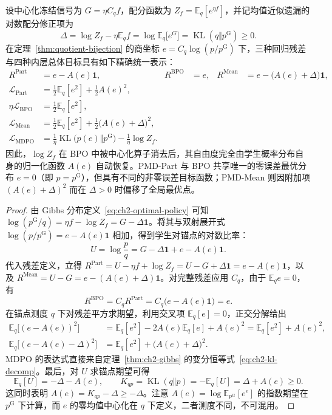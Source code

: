 \documentclass[lang=cn,scheme=chinese,openany]{elegantbook}
\newcommand{\E}{\mathbb E}
\newcommand{\KL}{\operatorname{KL}}
\begin{document}
\begin{theorem}[四种内层目标在同一商坐标中的精确表达]
\label{thm:quotient-losses}
设中心化冻结信号为 $G=\eta C_q f$，配分函数为 $Z_f=\E_q[e^{\eta f}]$，并记均值近似遗漏的对数配分修正项为
\begin{equation}
\Delta=\log Z_f-\eta\E_q f
=\log\E_q\bigl[e^G\bigr]=\KL(q\Vert p^{\mathrm G})\ge 0.
\end{equation}
在定理~\ref{thm:quotient-bijection} 的商坐标 $e=C_q\log(p/p^{\mathrm G})$ 下，三种回归残差与四种内层总体目标具有如下精确统一表示：
\begin{align}
R^{\mathrm{Part}}&=e-A(e)\mathbf1,&
R^{\mathrm{BPO}}&=e,&
R^{\mathrm{Mean}}&=e-\bigl(A(e)+\Delta\bigr)\mathbf1,\\
\mathcal L_{\mathrm{Part}}&=\tfrac12\E_q[e^2]+\tfrac12 A(e)^2,\\
\eta\mathcal L_{\mathrm{BPO}}&=\tfrac12\E_q[e^2],\\
\mathcal L_{\mathrm{Mean}}&=\tfrac12\E_q[e^2]+\tfrac12\bigl(A(e)+\Delta\bigr)^2,\\
\mathcal L_{\mathrm{MDPO}}&=\frac1\eta\KL\bigl(p(e)\Vert p^{\mathrm G}\bigr)-\frac1\eta\log Z_f.
\label{eq:quotient-four-losses}
\end{align}
因此，$\log Z_f$ 在 BPO 中被中心化算子消去后，其自由度完全由学生概率分布自身的归一化函数 $A(e)$ 自动恢复。PMD-Part 与 BPO 共享唯一的零误差最优分布 $e=0$（即 $p=p^{\mathrm G}$），但具有不同的非零误差目标函数；PMD-Mean 则因附加项 $(A(e)+\Delta)^2$ 而在 $\Delta>0$ 时偏移了全局最优点。
\end{theorem}
\begin{proof}
由 Gibbs 分布定义~\eqref{eq:ch2-optimal-policy} 可知 $\log(p^{\mathrm G}/q)=\eta f-\log Z_f=G-\Delta\mathbf1$。将其与双射展开式 $\log(p/p^{\mathrm G})=e-A(e)\mathbf1$ 相加，得到学生对锚点的对数比率：
\begin{equation}
U=\log\frac pq=G-\Delta\mathbf1+e-A(e)\mathbf1.
\end{equation}
代入残差定义，立得 $R^{\mathrm{Part}}=U-\eta f+\log Z_f=U-G+\Delta\mathbf1=e-A(e)\mathbf1$，以及 $R^{\mathrm{Mean}}=U-G=e-(A(e)+\Delta)\mathbf1$。对完整残差应用 $C_q$，由于 $\E_q e=0$，有
\begin{equation}
R^{\mathrm{BPO}}=C_q R^{\mathrm{Part}}=C_q\bigl(e-A(e)\mathbf1\bigr)=e.
\end{equation}
在锚点测度 $q$ 下对残差平方求期望，利用交叉项 $\E_q[e]=0$，正交分解给出
\begin{align}
\E_q\bigl[(e-A(e))^2\bigr]&=\E_q[e^2]-2A(e)\E_q[e]+A(e)^2=\E_q[e^2]+A(e)^2,\\
\E_q\bigl[(e-A(e)-\Delta)^2\bigr]&=\E_q[e^2]+\bigl(A(e)+\Delta\bigr)^2.
\end{align}
MDPO 的表达式直接来自定理~\ref{thm:ch2-gibbs} 的变分恒等式~\eqref{eq:ch2-kl-decomp}。最后，对 $U$ 求锚点期望可得
\begin{equation}
\E_q[U]=-\Delta-A(e),\qquad K_{qp}=\KL(q\Vert p)=-\E_q[U]=\Delta+A(e)\ge0.
\end{equation}
这同时表明 $A(e)=K_{qp}-\Delta\ge -\Delta$。注意 $A(e)=\log\E_{p^{\mathrm G}}[e^e]$ 的指数期望在 $p^{\mathrm G}$ 下计算，而 $e$ 的零均值中心化在 $q$ 下定义，二者测度不同，不可混用。
\end{proof}
\end{document}
